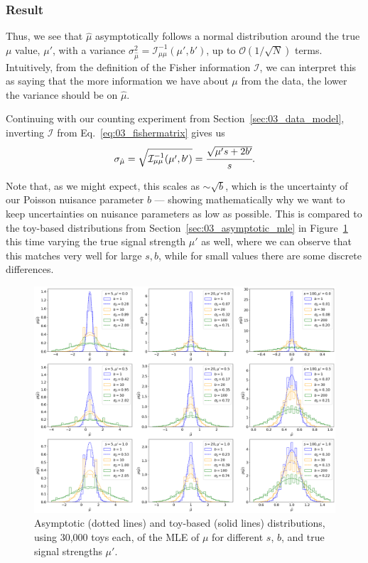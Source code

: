 \subsubsection{Result}
\label{sec:03_pmle_result}

Thus, we see that $\hat \mu$ asymptotically follows a normal distribution around the true $\mu$ value, $\mu'$, with a variance $\sigma_{\hat\mu}^2 = \mathcal I^{-1}_{\mu\mu}(\mu', b')$, up to $\mathcal O (1/\sqrt{N})$ terms.
Intuitively, from the definition of the Fisher information $\mathcal I$, we can interpret this as saying that the more information we have about $\mu$ from the data, the lower the variance should be on $\hat \mu$.

Continuing with our counting experiment from Section~\ref{sec:03_data_model}, inverting $\mathcal I$ from Eq.~\ref{eq:03_fishermatrix} gives us
\begin{equation}
    \sigma_{\hat\mu} = \sqrt{\mathcal I^{-1}_{\mu\mu}(\mu', b')} = \cfrac{\sqrt{\mu' s + 2b'}}{s}.
\label{eq:03_asymstd}
\end{equation}

Note that, as we might expect, this scales as $\sim \sqrt{b}$, which is the uncertainty of our Poisson nuisance parameter $b$ --- showing mathematically why we want to keep uncertainties on nuisance parameters as low as possible.
This is compared to the toy-based distributions from Section~\ref{sec:03_asymptotic_mle} in Figure~\ref{fig:03_p_mle_asym} this time varying the true signal strength $\mu'$ as well, where we can observe that this matches very well for large $s, b$, while for small values there are some discrete differences. 

\begin{figure}[htb]
\centering
\includegraphics[width=\textwidth]{figures/03-Stats/05-asymptotic-mle/4.png}
\caption{Asymptotic (dotted lines) and toy-based (solid lines) distributions, using 30,000 toys each, of the MLE of $\mu$ for different $s$, $b$, and true signal strengths $\mu'$.}
\label{fig:03_p_mle_asym}
\end{figure}

